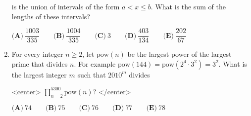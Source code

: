 \documentclass{article}
\begin{document}
\begin{enumerate}[label=\arabic*., itemsep=0.5em]
is the union of intervals of the form \(a<x\le b\). What is the sum of the lengths of these intervals?

\(\textbf{(A)}\ \dfrac{1003}{335} \qquad \textbf{(B)}\ \dfrac{1004}{335} \qquad \textbf{(C)}\ 3 \qquad \textbf{(D)}\ \dfrac{403}{134} \qquad \textbf{(E)}\ \dfrac{202}{67}\)\par \vspace{0.5em}\item For every integer \(n\ge2\), let \(\text{pow}(n)\) be the largest power of the largest prime that divides \(n\). For example \(\text{pow}(144)=\text{pow}(2^4\cdot3^2)=3^2\). What is the largest integer \(m\) such that \(2010^m\) divides

<center>
\(\prod_{n=2}^{5300}\text{pow}(n)\)?
</center>


\(\textbf{(A)}\ 74 \qquad \textbf{(B)}\ 75 \qquad \textbf{(C)}\ 76 \qquad \textbf{(D)}\ 77 \qquad \textbf{(E)}\ 78\)\par \vspace{0.5em}\end{enumerate}
\end{document}
